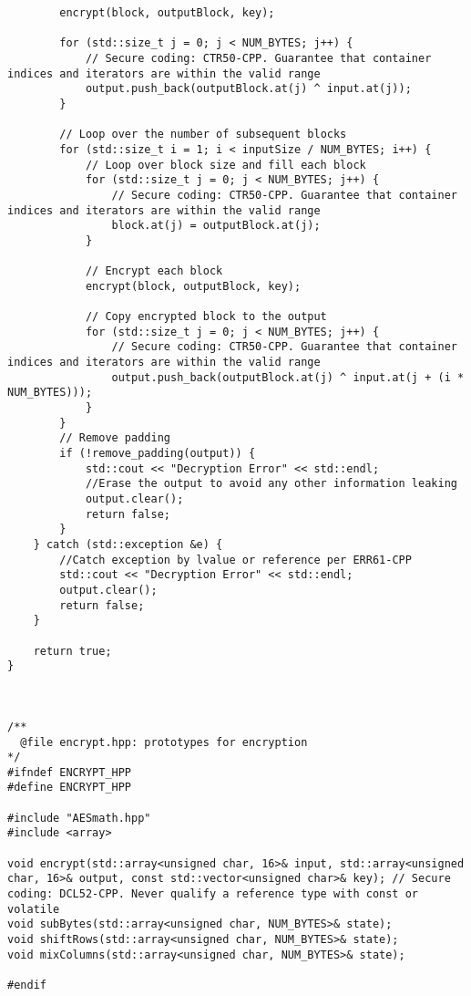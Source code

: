 \documentclass[a4paper,12pt]{article}
\begin{document}
{\begin{lstlisting}
        encrypt(block, outputBlock, key);

        for (std::size_t j = 0; j < NUM_BYTES; j++) {
            // Secure coding: CTR50-CPP. Guarantee that container indices and iterators are within the valid range
            output.push_back(outputBlock.at(j) ^ input.at(j));
        }

        // Loop over the number of subsequent blocks
        for (std::size_t i = 1; i < inputSize / NUM_BYTES; i++) {
            // Loop over block size and fill each block
            for (std::size_t j = 0; j < NUM_BYTES; j++) {
                // Secure coding: CTR50-CPP. Guarantee that container indices and iterators are within the valid range
                block.at(j) = outputBlock.at(j);
            }

            // Encrypt each block
            encrypt(block, outputBlock, key);

            // Copy encrypted block to the output
            for (std::size_t j = 0; j < NUM_BYTES; j++) {
                // Secure coding: CTR50-CPP. Guarantee that container indices and iterators are within the valid range
                output.push_back(outputBlock.at(j) ^ input.at(j + (i * NUM_BYTES)));
            }
        }
        // Remove padding
        if (!remove_padding(output)) {
            std::cout << "Decryption Error" << std::endl;
            //Erase the output to avoid any other information leaking
            output.clear();
            return false;
        }
    } catch (std::exception &e) {
        //Catch exception by lvalue or reference per ERR61-CPP
        std::cout << "Decryption Error" << std::endl;
        output.clear();
        return false;
    }

    return true;
}



/**
  @file encrypt.hpp: prototypes for encryption
*/
#ifndef ENCRYPT_HPP
#define ENCRYPT_HPP 

#include "AESmath.hpp"
#include <array>

void encrypt(std::array<unsigned char, 16>& input, std::array<unsigned char, 16>& output, const std::vector<unsigned char>& key); // Secure coding: DCL52-CPP. Never qualify a reference type with const or volatile
void subBytes(std::array<unsigned char, NUM_BYTES>& state);
void shiftRows(std::array<unsigned char, NUM_BYTES>& state);
void mixColumns(std::array<unsigned char, NUM_BYTES>& state);

#endif




\end{lstlisting}}
\end{document}
